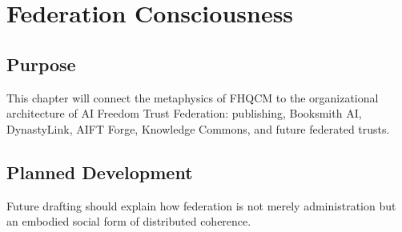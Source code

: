 \chapter{Federation Consciousness}

\section{Purpose}

This chapter will connect the metaphysics of FHQCM to the organizational architecture of AI Freedom Trust Federation: publishing, Booksmith AI, DynastyLink, AIFT Forge, Knowledge Commons, and future federated trusts.


\section{Planned Development}

Future drafting should explain how federation is not merely administration but an embodied social form of distributed coherence.
